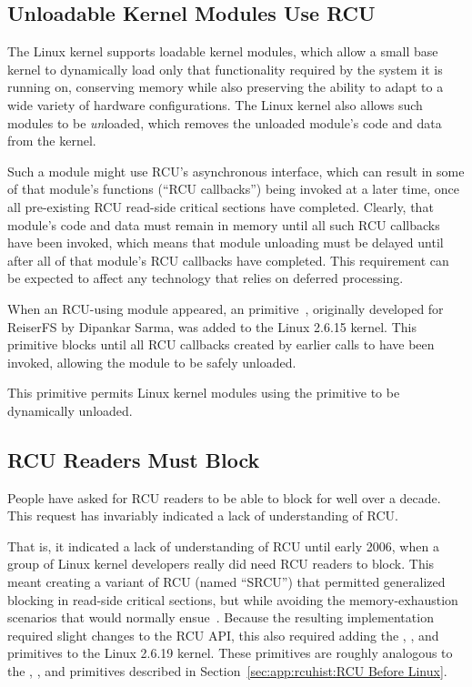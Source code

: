 \subsection{Unloadable Kernel Modules Use RCU}
\label{sec:app:rcuhist:Unloadable Kernel Modules Use RCU}

The Linux kernel supports loadable kernel modules, which
allow a small base kernel to dynamically load only that functionality
required by the system it is running on, conserving memory while
also preserving the ability to adapt to a wide variety of hardware
configurations.
The Linux kernel also allows such modules to be \emph{un}loaded,
which removes the unloaded module's code and data from
the kernel.

Such a module might use RCU's asynchronous  interface,
which can result in some of that module's functions (``RCU callbacks'')
being invoked at a later time, once all pre-existing RCU read-side
critical sections have completed.
Clearly, that module's code and data must remain in memory until all
such RCU callbacks have been invoked, which means that module unloading
must be delayed until after all of that module's RCU callbacks have
completed.
This requirement can be expected to affect any technology that relies
on deferred processing.

When an RCU-using module appeared, an 
primitive~\cite{PaulEMcKenney2007rcubarrier},
originally developed for ReiserFS by Dipankar Sarma,
was added to the Linux 2.6.15 kernel.
This primitive blocks until all RCU callbacks created by earlier
calls to  have been invoked, allowing the module
to be safely unloaded.

This primitive permits Linux kernel modules using the 
primitive to be dynamically unloaded.

\subsection{RCU Readers Must Block}
\label{sec:app:rcuhist:RCU Readers Must Block}

People have asked for RCU readers to be able to block for well over
a decade.
This request has invariably indicated a lack of understanding of RCU.

That is, it indicated a lack of understanding of RCU until early 2006,
when a group of Linux kernel developers really did
need RCU readers to block.
This meant creating a variant of RCU (named ``SRCU'')
that permitted generalized blocking
in read-side critical sections, but while avoiding the
memory-exhaustion scenarios
that would normally ensue~\cite{PaulEMcKenney2006c}.
Because the resulting implementation required slight changes to the RCU
API, this also required adding the
, , and
 primitives to the Linux 2.6.19 kernel.
These primitives are roughly analogous to the
, , and 
primitives described in Section~\ref{sec:app:rcuhist:RCU Before Linux}.

